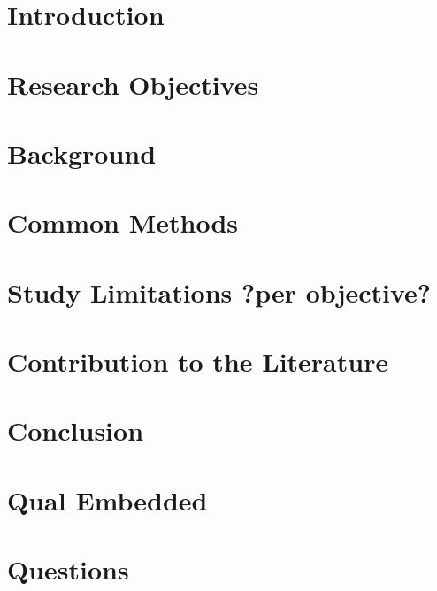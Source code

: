 \documentclass[12pt]{memoir}
\begin{document}
\pagestyle{plain}



\tableofcontents
\thispagestyle{empty}
\clearpage

\setcounter{page}{1} 
\chapter{Introduction}


\chapter{Research Objectives}


\chapter{Background}


\chapter{Common Methods}


\chapter{Study Limitations ?per objective?}


\chapter{Contribution to the Literature}


\chapter{Conclusion}


\printglossary[nonumberlist]

\newpage



\appendix
\addappheadtotoc
\chapter{Qual Embedded}


\chapter{Questions}

\end{document}
